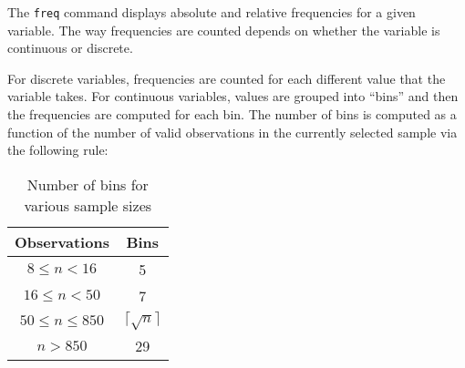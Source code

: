 The \texttt{freq} command displays absolute and relative frequencies
for a given variable. The way frequencies are counted depends on
whether the variable is continuous or discrete.

For discrete variables, frequencies are counted for each different
value that the variable takes. For continuous variables, values are
grouped into ``bins'' and then the frequencies are computed for each
bin. The number of bins is computed as a function of the number of
valid observations in the currently selected sample via the following
rule:

\begin{table}[htbp]
  \centering
  \begin{tabular}{cc}
\hline
  Observations & Bins \\
\hline
  $8 \le n < 16$ & 5 \\
  $16 \le n < 50 $ & 7 \\
  $50 \le n \le 850 $ & $\lceil \sqrt{n} \rceil$  \\
  $n > 850 $ & 29 \\
\hline
\end{tabular}
\caption{Number of bins for various sample sizes}
\label{tab:bins}
\end{table}


